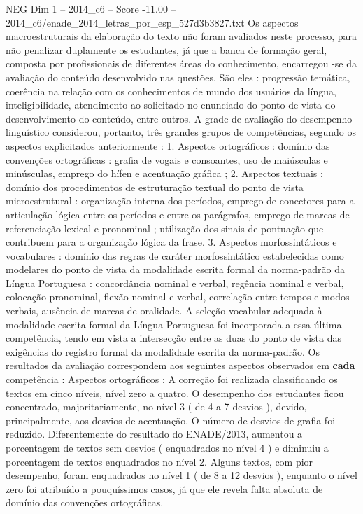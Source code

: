 \begin{textsample}{NEG Dim 1 – 2014\_c6 – Score -11.00 – 2014\_c6/enade\_2014\_letras\_por\_esp\_527d3b3827.txt}
Os aspectos macroestruturais da elaboração do texto não foram avaliados neste processo, para não penalizar duplamente os estudantes, já que a banca de formação geral, composta por profissionais de diferentes áreas do conhecimento, encarregou -se da avaliação do conteúdo desenvolvido nas questões.
São eles : progressão temática, coerência na relação com os conhecimentos de mundo dos usuários da língua, inteligibilidade, atendimento ao solicitado no enunciado do ponto de vista do desenvolvimento do conteúdo, entre outros.
A grade de avaliação do desempenho linguístico considerou, portanto, três grandes grupos de competências, segundo os aspectos explicitados anteriormente : 1.
Aspectos ortográficos : domínio das convenções ortográficas : grafia de vogais e consoantes, uso de maiúsculas e minúsculas, emprego do hífen e acentuação gráfica ; 2.
Aspectos textuais : domínio dos procedimentos de estruturação textual do ponto de vista microestrutural : organização interna dos períodos, emprego de conectores para a articulação lógica entre os períodos e entre os parágrafos, emprego de marcas de referenciação lexical e pronominal ; utilização dos sinais de pontuação que contribuem para a organização lógica da frase. 3.
Aspectos morfossintáticos e vocabulares : domínio das regras de caráter morfossintático estabelecidas como modelares do ponto de vista da modalidade escrita formal da norma-padrão da Língua Portuguesa : concordância nominal e verbal, regência nominal e verbal, colocação pronominal, flexão nominal e verbal, correlação entre tempos e modos verbais, ausência de marcas de oralidade.
A seleção vocabular adequada à modalidade escrita formal da Língua Portuguesa foi incorporada a essa última competência, tendo em vista a intersecção entre as duas do ponto de vista das exigências do registro formal da modalidade escrita da norma-padrão.
Os resultados da avaliação correspondem aos seguintes aspectos observados em \textbf{cada} competência : Aspectos ortográficos : A correção foi realizada classificando os textos em cinco níveis, nível zero a quatro.
O desempenho dos estudantes ficou concentrado, majoritariamente, no nível 3 ( de 4 a 7 desvios ), devido, principalmente, aos desvios de acentuação.
O número de desvios de grafia foi reduzido.
Diferentemente do resultado do ENADE/2013, aumentou a porcentagem de textos sem desvios ( enquadrados no nível 4 ) e diminuiu a porcentagem de textos enquadrados no nível 2.
Alguns textos, com pior desempenho, foram enquadrados no nível 1 ( de 8 a 12 desvios ), enquanto o nível zero foi atribuído a pouquíssimos casos, já que ele revela falta absoluta de domínio das convenções ortográficas.

\end{textsample}
